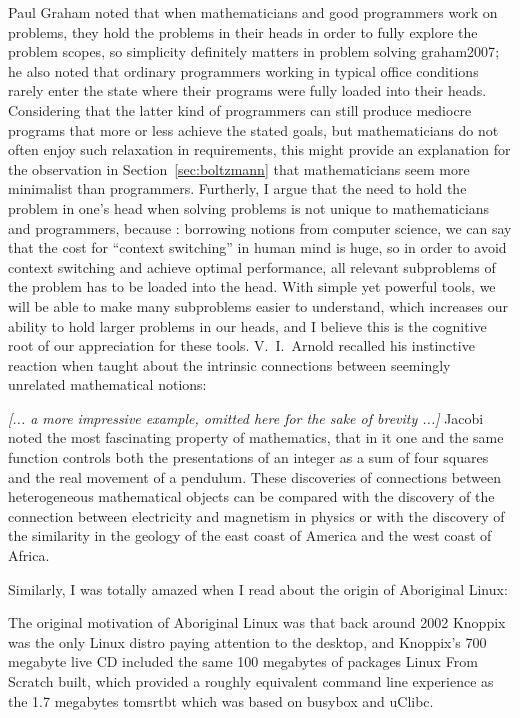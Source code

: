 Paul Graham noted that when mathematicians and good programmers work on
problems, they hold the problems in their heads in order to fully explore the
problem scopes, so simplicity definitely matters in problem solving\cupercite%
{graham2007}; he also noted that ordinary programmers working in typical
office conditions rarely enter the state where their programs were fully loaded
into their heads.  Considering that the latter kind of programmers can still
produce mediocre programs that more or less achieve the stated goals, but
mathematicians do not often enjoy such relaxation in requirements, this might
provide an explanation for the observation in Section~\ref{sec:boltzmann}
that mathematicians seem more minimalist than programmers.  Furtherly, I argue
that the need to hold the problem in one's head when solving problems is not
unique to mathematicians and programmers, because : borrowing notions from computer science, we can say that the
cost for ``context switching'' in human mind is huge, so in order to avoid
context switching and achieve optimal performance, all relevant subproblems
of the problem has to be loaded into the head.  With simple yet powerful tools,
we will be able to make many subproblems easier to understand, which increases
our ability to hold larger problems in our heads, and I believe this is the
cognitive root of our appreciation for these tools.  V.~I.\ Arnold recalled
his instinctive reaction when taught about the intrinsic connections between
seemingly unrelated mathematical notions:
\begin{quoting}
	\emph{[... a more impressive example, omitted here for the sake of
	brevity ...]} Jacobi noted the most fascinating property of mathematics,
	that in it one and the same function controls both the presentations of
	an integer as a sum of four squares and the real movement of a pendulum.
	These discoveries of connections between heterogeneous mathematical objects
	can be compared with the discovery of the connection between electricity
	and magnetism in physics or with the discovery of the similarity in
	the geology of the east coast of America and the west coast of Africa.
\end{quoting}
Similarly, I was totally amazed when I read about the
origin of Aboriginal Linux:
\begin{quoting}
	The original motivation of Aboriginal Linux was that back around
	2002 Knoppix was the only Linux distro paying attention to the
	desktop, and Knoppix's 700 megabyte live CD included the same
	100 megabytes of packages Linux From Scratch built, which
	provided a roughly equivalent command line experience as the
	1.7 megabytes tomsrtbt which was based on busybox and uClibc.
\end{quoting}

